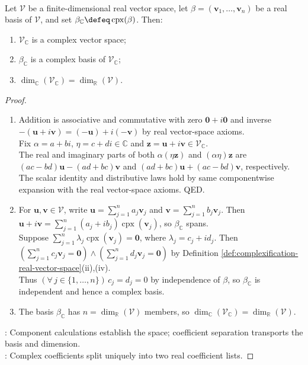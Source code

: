 \begin{proposition} \label{prop:complexification-vector-space-basis} \\
Let $\mathcal{V}$ be a finite-dimensional real vector space, let $\beta=(\mathbf{v}_1,\ldots,\mathbf{v}_n)$ be a real basis of $\mathcal{V}$, and set $\beta_{\mathbb{C}}\defeq\operatorname{cpx}(\beta)$. Then:
\begin{enumerate}[label=(\roman*)]
\setlength{\itemsep}{0pt}
\item $\mathcal{V}_{\mathbb{C}}$ is a complex vector space;
\item $\beta_{\mathbb{C}}$ is a complex basis of $\mathcal{V}_{\mathbb{C}}$;
\item $\dim_{\mathbb{C}}(\mathcal{V}_{\mathbb{C}})=\dim_{\mathbb{R}}(\mathcal{V})$.
\end{enumerate}
\begin{proof}
\begin{enumerate}[label=(\roman*)]
\setlength{\itemsep}{0pt}
\item Addition is associative and commutative with zero $\mathbf{0}+i\mathbf{0}$ and inverse $-(\mathbf{u}+i\mathbf{v})=(-\mathbf{u})+i(-\mathbf{v})$ by real vector-space axioms.\\
Fix $\alpha=a+bi$, $\eta=c+di\in\mathbb{C}$ and $\mathbf{z}=\mathbf{u}+i\mathbf{v}\in\mathcal{V}_{\mathbb{C}}$.\\
The real and imaginary parts of both $\alpha(\eta\mathbf{z})$ and $(\alpha\eta)\mathbf{z}$ are $(ac-bd)\mathbf{u}-(ad+bc)\mathbf{v}$ and $(ad+bc)\mathbf{u}+(ac-bd)\mathbf{v}$, respectively.\\
The scalar identity and distributive laws hold by same componentwise expansion with the real vector-space axioms. QED.
\item For $\mathbf{u},\mathbf{v}\in\mathcal{V}$, write $\mathbf{u}=\sum\limits_{j=1}^{n}a_j\mathbf{v}_j$ and $\mathbf{v}=\sum\limits_{j=1}^{n}b_j\mathbf{v}_j$. Then $\mathbf{u}+i\mathbf{v}=\sum\limits_{j=1}^{n}(a_j+ib_j)\operatorname{cpx}(\mathbf{v}_j)$, so $\beta_{\mathbb{C}}$ spans.\\
Suppose $\sum\limits_{j=1}^{n}\lambda_j\operatorname{cpx}(\mathbf{v}_j)=\mathbf{0}$, where $\lambda_j=c_j+id_j$. Then $(\sum\limits_{j=1}^{n}c_j\mathbf{v}_j=\mathbf{0})\land(\sum\limits_{j=1}^{n}d_j\mathbf{v}_j=\mathbf{0})$ by Definition \ref{def:complexification-real-vector-space}(ii),(iv).\\
Thus $(\forall\,j\in\{1,\ldots,n\})\,c_j=d_j=0$ by independence of $\beta$, so $\beta_{\mathbb{C}}$ is independent and hence a complex basis.
\item The basis $\beta_{\mathbb{C}}$ has $n=\dim_{\mathbb{R}}(\mathcal{V})$ members, so $\dim_{\mathbb{C}}(\mathcal{V}_{\mathbb{C}})=\dim_{\mathbb{R}}(\mathcal{V})$.
\end{enumerate}
: Component calculations establish the space; coefficient separation transports the basis and dimension.\\
: Complex coefficients split uniquely into two real coefficient lists.
\end{proof}
\end{proposition}

